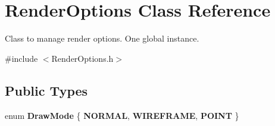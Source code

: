 \hypertarget{class_render_options}{\section{Render\+Options Class Reference}
\label{class_render_options}
}


Class to manage render options. One global instance.  




{\ttfamily \#include $<$Render\+Options.\+h$>$}

\subsection*{Public Types}
\begin{DoxyCompactItemize}
\item 
\hypertarget{class_render_options_ab4369ce2cb9d142b6483e5f3bea5e2d8}{enum {\bfseries Draw\+Mode} \{ {\bfseries N\+O\+R\+M\+A\+L}, 
{\bfseries W\+I\+R\+E\+F\+R\+A\+M\+E}, 
{\bfseries P\+O\+I\+N\+T}
 \}}\label{class_render_options_ab4369ce2cb9d142b6483e5f3bea5e2d8}

\end{DoxyCompactItemize}
